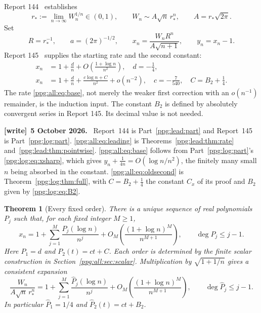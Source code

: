 \documentclass[11pt,letterpaper]{article}
\newtheorem{theorem}{Theorem}[section]
\theoremstyle{remark}\newtheorem{remark}[theorem]{Remark}
\numberwithin{equation}{section}
\newenvironment{writenote}[1][]{\par\smallskip\begingroup\small
 \noindent\textbf{[write]}\if\relax\detokenize{#1}\relax\else~\textbf{#1.}\fi\ }%
 {\par\endgroup\smallskip}
\begin{document}
Report 144~\cite{r144} establishes
\begin{equation}\label{ppg:all:eq:leading}
 r_*:=\lim_{n\to\infty}W_n^{1/n}\in(0,1),\qquad
 W_n\sim A\sqrt n\,r_*^n,\qquad A=r_*\sqrt{2\pi}.
\end{equation}
Set
\begin{equation}\label{ppg:all:eq:normalization}
 R=r_*^{-1},\qquad a=(2\pi)^{-1/2},\qquad
 x_n=\frac{W_nR^n}{A\sqrt{n+1}},\qquad y_n=x_n-1.
\end{equation}
Report 145~\cite{r145} supplies the starting rate and the second constant:
\begin{align}
 x_n&=1+\frac d n+O\!\left(\frac{1+\log n}{n^2}\right),\quad d=-\frac14,
 \label{ppg:all:eq:base}\\
 x_n&=1+\frac d n+\frac{c\log n+C}{n^2}+o(n^{-2}),
 \quad c=-\frac7{540},\quad C=B_2+\frac14.\label{ppg:all:eq:oldsecond}
\end{align}
The rate \eqref{ppg:all:eq:base}, not merely the weaker first correction with an $o(n^{-1})$ remainder, is the induction input. The constant $B_2$ is defined by absolutely convergent series in Report 145. Its decimal value is not needed.
\begin{writenote}[5 October 2026]
Report~144 is Part~\ref{ppg:lead:part} and Report~145 is Part~\ref{ppg:log:part}. \eqref{ppg:all:eq:leading} is Theorems~\ref{ppg:lead:thm:rate} and~\ref{ppg:lead:thm:pointwise}. \eqref{ppg:all:eq:base} follows from Part~\ref{ppg:log:part}'s \eqref{ppg:log:eq:xsharp}, which gives $y_n+\frac1{4n}=O(\log n/n^2)$, the finitely many small $n$ being absorbed in the constant. \eqref{ppg:all:eq:oldsecond} is Theorem~\ref{ppg:log:thm:full}, with $C=B_2+\frac14$ the constant $C_x$ of its proof and $B_2$ given by \eqref{ppg:log:eq:B2}.
\end{writenote}

\begin{theorem}[Every fixed order]\label{ppg:all:thm:all}
There is a unique sequence of real polynomials $P_j$ such that, for each fixed integer $M\ge1$,
\begin{equation}\label{ppg:all:eq:all}
 x_n=1+\sum_{j=1}^M\frac{P_j(\log n)}{n^j}
       +O_M\!\left(\frac{(1+\log n)^M}{n^{M+1}}\right),
 \qquad \deg P_j\le j-1.
\end{equation}
Here $P_1=d$ and $P_2(t)=ct+C$. Each order is determined by the finite scalar construction in Section~\ref{ppg:all:sec:scalar}. Multiplication by $\sqrt{1+1/n}$ gives a consistent expansion
\begin{equation}\label{ppg:all:eq:allW}
 \frac{W_n}{A\sqrt n\,r_*^n}
 =1+\sum_{j=1}^M\frac{\widehat P_j(\log n)}{n^j}
       +O_M\!\left(\frac{(1+\log n)^M}{n^{M+1}}\right),
 \qquad \deg\widehat P_j\le j-1.
\end{equation}
In particular $\widehat P_1=1/4$ and $\widehat P_2(t)=ct+B_2$.
\end{theorem}
\end{document}
